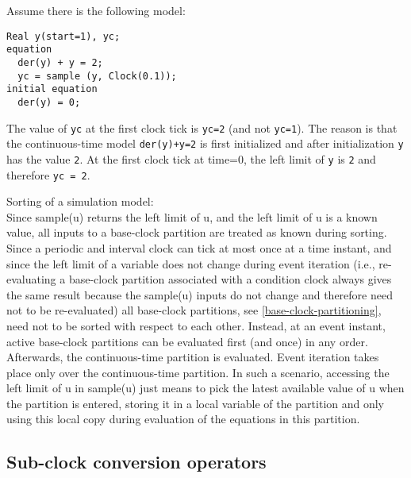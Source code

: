 \begin{example}
Assume there is the following model:
\begin{lstlisting}[language=modelica]
  Real y(start=1), yc;
equation
  der(y) + y = 2;
  yc = sample (y, Clock(0.1));
initial equation
  der(y) = 0;
\end{lstlisting}

The value of \lstinline!yc! at the first clock tick is \lstinline!yc=2! (and not \lstinline!yc=1!).  The reason is that the continuous-time model \lstinline!der(y)+y=2!
is first initialized and after initialization \lstinline!y! has the value \lstinline!2!. At the first clock tick at time=0, the left limit of \lstinline!y! is \lstinline!2!
and therefore \lstinline!yc = 2!.

Sorting of a simulation model:\\
Since sample(u) returns the left limit of u, and the left limit of u is
a known value, all inputs to a base-clock partition are treated as known
during sorting. Since a periodic and interval clock can tick at most
once at a time instant, and since the left limit of a variable does not
change during event iteration (i.e., re-evaluating a base-clock
partition associated with a condition clock always gives the same result
because the sample(u) inputs do not change and therefore need not to be
re-evaluated) all base-clock partitions, see \cref{base-clock-partitioning}, need
not to be sorted with respect to each other. Instead, at an event
instant, active base-clock partitions can be evaluated first (and once)
in any order. Afterwards, the continuous-time partition is evaluated.
Event iteration takes place only over the continuous-time partition. In
such a scenario, accessing the left limit of u in sample(u) just means
to pick the latest available value of u when the partition is entered,
storing it in a local variable of the partition and only using this
local copy during evaluation of the equations in this partition.
\end{example}

\subsection{Sub-clock conversion operators}\label{sub-clock-conversion-operators}

